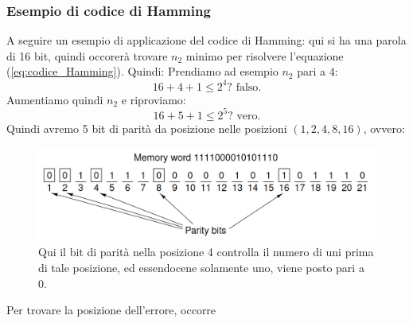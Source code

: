 \documentclass[12pt]{article}
\begin{document}
\subsubsection{Esempio di codice di Hamming}
A seguire un esempio di applicazione del codice di Hamming: qui si ha una parola di 16 bit, quindi occorerà trovare $n_2$ minimo per risolvere l'equazione (\ref{eq:codice_Hamming}). Quindi:
Prendiamo ad esempio $n_2$ pari a $4$:
\[16 + 4 + 1 \leq 2^{4} ? \text{ falso.}\]
Aumentiamo quindi $n_2$ e riproviamo:
\[16 + 5 + 1 \leq 2^{5} ? \text{ vero.}\]
Quindi avremo 5 bit di parità da posizione nelle posizioni $(1, 2, 4, 8, 16)$, ovvero:
\begin{figure}[!htb]
    \centering
    \includegraphics[width=1\textwidth, height=.7\textheight,keepaspectratio]{rappresentazione_dati/hamming_example.png} %
    \begin{center}
        \caption{\label{fig:esempio_Hamming}Qui il bit di parità nella posizione 4 controlla il numero di uni prima di tale posizione, ed essendocene solamente uno, viene posto pari a 0.} %
    \end{center}
\end{figure}
Per trovare la posizione dell'errore, occorre
\end{document}

